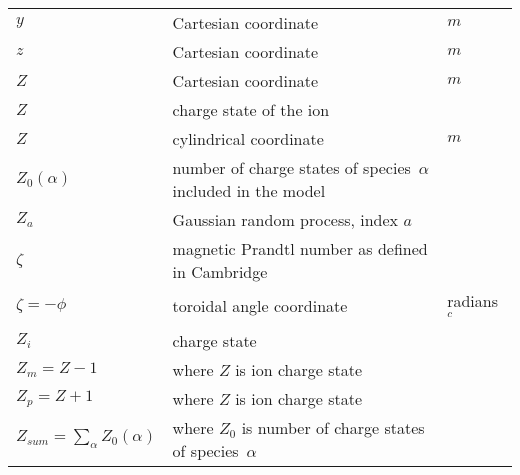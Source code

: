 \begin{longtable}{|p{3.0cm}|p{10.0cm}|p{3.0cm}|}
$y$ & Cartesian coordinate  & $m$ \\
$z$ & Cartesian coordinate  & $m$ \\
$Z$ & Cartesian coordinate  & $m$ \\
$Z$ & charge state of the ion & \\
$Z$ & cylindrical coordinate  & $m$ \\
$Z_0(\alpha)$ & number of charge states of species~$\alpha$ included in the model & \\
$Z_a$ & Gaussian random process, index $a$  & \\
$\zeta$ & magnetic Prandtl number as defined in Cambridge & \\
$\zeta=-\phi$ & toroidal angle coordinate & radians $^c$ \\
$Z_i$ & charge state & \\
$Z_m=Z-1$ & where $Z$ is ion charge state & \\
$Z_p=Z+1$ & where $Z$ is ion charge state & \\
$Z_{sum}=\sum_\alpha Z_0(\alpha)$ & where $Z_0$ is number of charge states of species~$\alpha$ & \\
\hline
\end{longtable}
